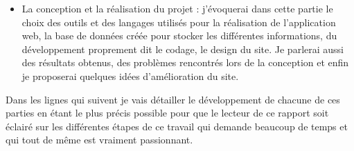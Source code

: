 \documentclass[12pt]{report}
\begin{document}
\begin{enumerate}[label*={\fontsize{12pt}{12pt}\selectfont \textbf{\arabic*.}}]
\begin{itemize}
	\item La conception et la réalisation du projet : j’évoquerai dans cette partie le choix des outils et des langages utilisés pour la réalisation de l’application web, la base de données créée pour stocker les différentes informations, du développement proprement dit le codage, le design du site. Je parlerai aussi des résultats obtenus, des problèmes rencontrés lors de la conception et enfin je proposerai quelques idées d’amélioration du site.
\end{itemize}\par


\vspace{\baselineskip}
\begin{justify}
Dans les lignes qui suivent je vais détailler le développement de chacune de ces parties en étant le plus précis possible pour que le lecteur de ce rapport soit éclairé sur les différentes étapes de ce travail qui demande beaucoup de temps et qui tout de même est vraiment passionnant.
\end{justify}\par


\vspace{\baselineskip}

\vspace{\baselineskip}

\vspace{\baselineskip}

\vspace{\baselineskip}
\setlength{\parskip}{9.96pt}

\vspace{\baselineskip}

\vspace{\baselineskip}

\vspace{\baselineskip}

\vspace{\baselineskip}

\vspace{\baselineskip}

\vspace{\baselineskip}

\vspace{\baselineskip}

\vspace{\baselineskip}

\vspace{\baselineskip}
\vspace{\baselineskip}


\end{enumerate}
\end{document}
